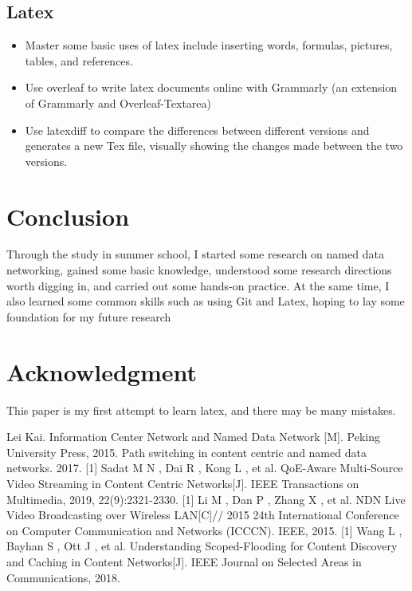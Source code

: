 \documentclass[conference]{IEEEtran}
\begin{document}
\subsection{Latex}
\begin{itemize}
    \item Master some basic uses of latex include inserting words, formulas, pictures, tables, and references.
    \item Use overleaf to write latex documents online with Grammarly (an extension of Grammarly and Overleaf-Textarea)
    \item Use latexdiff to compare the differences between different versions and generates a new Tex file, visually showing the changes made between the two versions.
\end{itemize}

\section{Conclusion}
Through the study in summer school, I started some research on named data networking, gained some basic knowledge, understood some research directions worth digging in, and carried out some hands-on practice. At the same time, I also learned some common skills such as using Git and Latex, hoping to lay some foundation for my future research
\section*{Acknowledgment}
   This paper is my first attempt to learn latex, and there may be many mistakes.



\begin{thebibliography}{00}
 Lei Kai. Information Center Network and Named Data Network [M]. Peking University Press, 2015.
 Path switching in content centric and named data networks.  2017.
 [1] Sadat M N ,  Dai R ,  Kong L , et al. QoE-Aware Multi-Source Video Streaming in Content Centric Networks[J]. IEEE Transactions on Multimedia, 2019, 22(9):2321-2330.
 [1] Li M , Dan P , Zhang X , et al. NDN Live Video Broadcasting over Wireless LAN[C]// 2015 24th International Conference on Computer Communication and Networks (ICCCN). IEEE, 2015.
 [1] Wang L ,  Bayhan S ,  Ott J , et al. Understanding Scoped-Flooding for Content Discovery and Caching in Content Networks[J]. IEEE Journal on Selected Areas in Communications, 2018.
\end{thebibliography}
\end{document}
